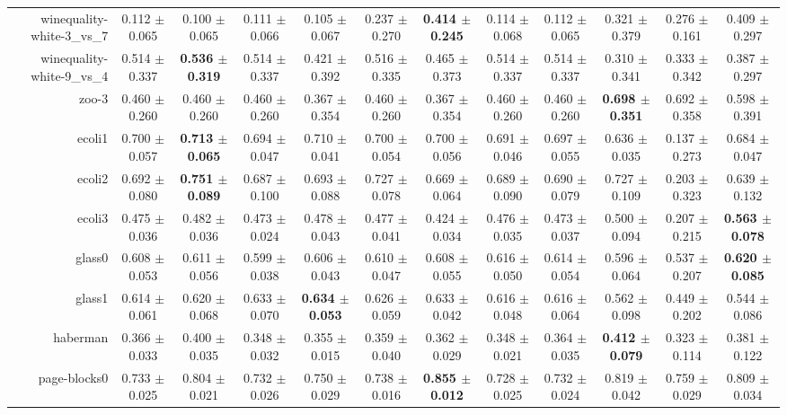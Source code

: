 \begin{table}[!ht]
{\begin{tabular}{r c c c c c c c c c c c}
winequality-white-3\_vs\_7 & 0.112 $\pm$ 0.065 & 0.100 $\pm$ 0.065 & 0.111 $\pm$ 0.066 & 0.105 $\pm$ 0.067 & 0.237 $\pm$ 0.270 & \textbf{0.414 $\pm$ 0.245} & 0.114 $\pm$ 0.068 & 0.112 $\pm$ 0.065 & 0.321 $\pm$ 0.379 & 0.276 $\pm$ 0.161 & 0.409 $\pm$ 0.297 \\
winequality-white-9\_vs\_4 & 0.514 $\pm$ 0.337 & \textbf{0.536 $\pm$ 0.319} & 0.514 $\pm$ 0.337 & 0.421 $\pm$ 0.392 & 0.516 $\pm$ 0.335 & 0.465 $\pm$ 0.373 & 0.514 $\pm$ 0.337 & 0.514 $\pm$ 0.337 & 0.310 $\pm$ 0.341 & 0.333 $\pm$ 0.342 & 0.387 $\pm$ 0.297 \\
zoo-3 & 0.460 $\pm$ 0.260 & 0.460 $\pm$ 0.260 & 0.460 $\pm$ 0.260 & 0.367 $\pm$ 0.354 & 0.460 $\pm$ 0.260 & 0.367 $\pm$ 0.354 & 0.460 $\pm$ 0.260 & 0.460 $\pm$ 0.260 & \textbf{0.698 $\pm$ 0.351} & 0.692 $\pm$ 0.358 & 0.598 $\pm$ 0.391 \\
ecoli1 & 0.700 $\pm$ 0.057 & \textbf{0.713 $\pm$ 0.065} & 0.694 $\pm$ 0.047 & 0.710 $\pm$ 0.041 & 0.700 $\pm$ 0.054 & 0.700 $\pm$ 0.056 & 0.691 $\pm$ 0.046 & 0.697 $\pm$ 0.055 & 0.636 $\pm$ 0.035 & 0.137 $\pm$ 0.273 & 0.684 $\pm$ 0.047 \\
ecoli2 & 0.692 $\pm$ 0.080 & \textbf{0.751 $\pm$ 0.089} & 0.687 $\pm$ 0.100 & 0.693 $\pm$ 0.088 & 0.727 $\pm$ 0.078 & 0.669 $\pm$ 0.064 & 0.689 $\pm$ 0.090 & 0.690 $\pm$ 0.079 & 0.727 $\pm$ 0.109 & 0.203 $\pm$ 0.323 & 0.639 $\pm$ 0.132 \\
ecoli3 & 0.475 $\pm$ 0.036 & 0.482 $\pm$ 0.036 & 0.473 $\pm$ 0.024 & 0.478 $\pm$ 0.043 & 0.477 $\pm$ 0.041 & 0.424 $\pm$ 0.034 & 0.476 $\pm$ 0.035 & 0.473 $\pm$ 0.037 & 0.500 $\pm$ 0.094 & 0.207 $\pm$ 0.215 & \textbf{0.563 $\pm$ 0.078} \\
glass0 & 0.608 $\pm$ 0.053 & 0.611 $\pm$ 0.056 & 0.599 $\pm$ 0.038 & 0.606 $\pm$ 0.043 & 0.610 $\pm$ 0.047 & 0.608 $\pm$ 0.055 & 0.616 $\pm$ 0.050 & 0.614 $\pm$ 0.054 & 0.596 $\pm$ 0.064 & 0.537 $\pm$ 0.207 & \textbf{0.620 $\pm$ 0.085} \\
glass1 & 0.614 $\pm$ 0.061 & 0.620 $\pm$ 0.068 & 0.633 $\pm$ 0.070 & \textbf{0.634 $\pm$ 0.053} & 0.626 $\pm$ 0.059 & 0.633 $\pm$ 0.042 & 0.616 $\pm$ 0.048 & 0.616 $\pm$ 0.064 & 0.562 $\pm$ 0.098 & 0.449 $\pm$ 0.202 & 0.544 $\pm$ 0.086 \\
haberman & 0.366 $\pm$ 0.033 & 0.400 $\pm$ 0.035 & 0.348 $\pm$ 0.032 & 0.355 $\pm$ 0.015 & 0.359 $\pm$ 0.040 & 0.362 $\pm$ 0.029 & 0.348 $\pm$ 0.021 & 0.364 $\pm$ 0.035 & \textbf{0.412 $\pm$ 0.079} & 0.323 $\pm$ 0.114 & 0.381 $\pm$ 0.122 \\
page-blocks0 & 0.733 $\pm$ 0.025 & 0.804 $\pm$ 0.021 & 0.732 $\pm$ 0.026 & 0.750 $\pm$ 0.029 & 0.738 $\pm$ 0.016 & \textbf{0.855 $\pm$ 0.012} & 0.728 $\pm$ 0.025 & 0.732 $\pm$ 0.024 & 0.819 $\pm$ 0.042 & 0.759 $\pm$ 0.029 & 0.809 $\pm$ 0.034 \\

\end{tabular}}
\end{table}
